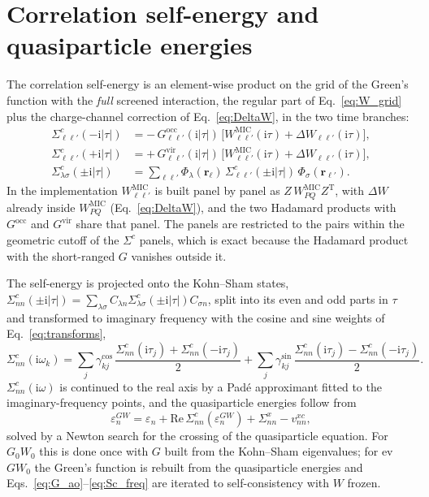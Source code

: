 \documentclass[11pt,a4paper]{article}
\newcommand{\br}{\mathbf{r}}
\newcommand{\ii}{\mathrm{i}}
\newcommand{\MIC}{\mathrm{MIC}}
\newcommand{\Tr}{\mathrm{T}}
\newcommand{\occ}{\mathrm{occ}}
\newcommand{\vir}{\mathrm{vir}}
\begin{document}
\section{Correlation self-energy and quasiparticle energies}

The correlation self-energy is an element-wise product on the grid of the Green's function with
the \emph{full} screened interaction, the regular part of Eq.~\eqref{eq:W_grid} plus the
charge-channel correction of Eq.~\eqref{eq:DeltaW}, in the two time branches:
\begin{align}
  \Sigma^{c}_{\ell\ell'}(-\ii|\tau|) &= -\,G^\occ_{\ell\ell'}(\ii|\tau|)\,
  \Big[W^\MIC_{\ell\ell'}(\ii\tau) + \Delta W_{\ell\ell'}(\ii\tau)\Big],
  \label{eq:Sc_neg}\\
  \Sigma^{c}_{\ell\ell'}(+\ii|\tau|) &= +\,G^\vir_{\ell\ell'}(\ii|\tau|)\,
  \Big[W^\MIC_{\ell\ell'}(\ii\tau) + \Delta W_{\ell\ell'}(\ii\tau)\Big],
  \label{eq:Sc_pos}\\
  \Sigma^{c}_{\lambda\sigma}(\pm\ii|\tau|) &= \sum_{\ell\ell'}\Phi_\lambda(\br_\ell)\,
  \Sigma^{c}_{\ell\ell'}(\pm\ii|\tau|)\,\Phi_\sigma(\br_{\ell'}).
  \label{eq:Sc_ao}
\end{align}
In the implementation $W^\MIC_{\ell\ell'}$ is built panel by panel as $Z\,W^\MIC_{PQ}Z^\Tr$,
with $\Delta W$ already inside $W^\MIC_{PQ}$ (Eq.~\eqref{eq:DeltaW}), and the two Hadamard
products with $G^\occ$ and $G^\vir$ share that panel. The panels are restricted to the pairs
within the geometric cutoff of the $\Sigma^c$ panels, which is exact because the Hadamard
product with the short-ranged $G$ vanishes outside it.

The self-energy is projected onto the Kohn--Sham states,
$\Sigma^c_{nn}(\pm\ii|\tau|) = \sum_{\lambda\sigma}C_{\lambda n}\Sigma^c_{\lambda\sigma}(\pm\ii|\tau|)C_{\sigma n}$,
split into its even and odd parts in $\tau$ and transformed to imaginary frequency with the
cosine and sine weights of Eq.~\eqref{eq:transforms},
\begin{equation}
  \Sigma^c_{nn}(\ii\omega_k) = \sum_j\gamma^{\cos}_{kj}\,
  \frac{\Sigma^c_{nn}(\ii\tau_j)+\Sigma^c_{nn}(-\ii\tau_j)}{2}
  + \sum_j\gamma^{\sin}_{kj}\,
  \frac{\Sigma^c_{nn}(\ii\tau_j)-\Sigma^c_{nn}(-\ii\tau_j)}{2}.
  \label{eq:Sc_freq}
\end{equation}
$\Sigma^c_{nn}(\ii\omega)$ is continued to the real axis by a Pad\'e approximant fitted to
the imaginary-frequency points, and the quasiparticle energies follow from
\begin{equation}
  \varepsilon^{GW}_n = \varepsilon_n + \mathrm{Re}\,\Sigma^c_{nn}(\varepsilon^{GW}_n)
  + \Sigma^x_{nn} - v^{xc}_{nn},
  \label{eq:QP}
\end{equation}
solved by a Newton search for the crossing of the quasiparticle equation. For $G_0W_0$ this is
done once with $G$ built from the Kohn--Sham eigenvalues; for ev$GW_0$ the Green's function is
rebuilt from the quasiparticle energies and Eqs.~\eqref{eq:G_ao}--\eqref{eq:Sc_freq} are
iterated to self-consistency with $W$ frozen.
\end{document}

